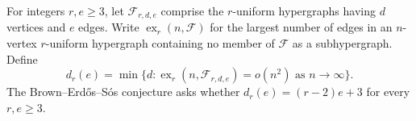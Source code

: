 For integers $r,e\geq3$, let $\mathcal F_{r,d,e}$ comprise the $r$-uniform hypergraphs having $d$ vertices and $e$ edges. Write $\operatorname{ex}_r(n,\mathcal F)$ for the largest number of edges in an $n$-vertex $r$-uniform hypergraph containing no member of $\mathcal F$ as a subhypergraph. Define
\[d_r(e)=\min\{d:\operatorname{ex}_r(n,\mathcal F_{r,d,e})=o(n^2)\text{ as }n\to\infty\}.\]
The Brown--Erd\H{o}s--S\'os conjecture asks whether $d_r(e)=(r-2)e+3$ for every $r,e\geq3$.
